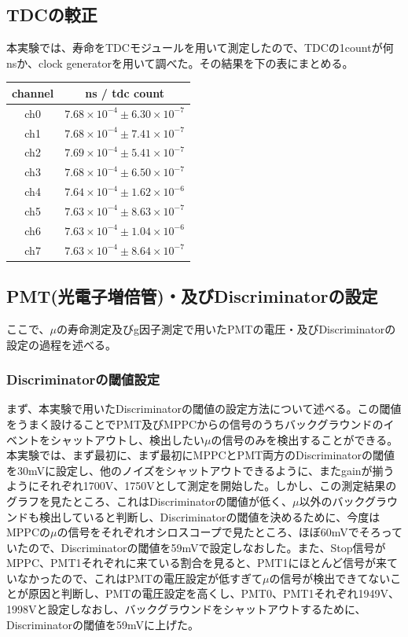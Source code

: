 \subsection{TDCの較正}
本実験では、寿命をTDCモジュールを用いて測定したので、TDCの1countが何nsか、clock generatorを用いて調べた。その結果を下の表にまとめる。
\begin{center}
  \begin{tabular}{c|c}
    channel & ns / tdc count \\ \hline
    ch0 & $7.68\times 10^{-4}\pm 6.30\times 10^{-7}$ \\
    ch1 & $7.68\times 10^{-4}\pm 7.41\times 10^{-7}$ \\
    ch2 & $7.69\times 10^{-4}\pm 5.41\times 10^{-7}$ \\
    ch3 & $7.68\times 10^{-4}\pm 6.50\times 10^{-7}$ \\
    ch4 & $7.64\times 10^{-4}\pm 1.62\times 10^{-6}$ \\
    ch5 & $7.63\times 10^{-4}\pm 8.63\times 10^{-7}$ \\
    ch6 & $7.63\times 10^{-4}\pm 1.04\times 10^{-6}$ \\
    ch7 & $7.63\times 10^{-4}\pm 8.64\times 10^{-7}$ \\
  \end{tabular}
\end{center}
\subsection{PMT(光電子増倍管)・及びDiscriminatorの設定}
ここで、$\mu$の寿命測定及びg因子測定で用いたPMTの電圧・及びDiscriminatorの設定の過程を述べる。
\subsubsection{Discriminatorの閾値設定}
まず、本実験で用いたDiscriminatorの閾値の設定方法について述べる。この閾値をうまく設けることでPMT及びMPPCからの信号のうちバックグラウンドのイベントをシャットアウトし、検出したい$\mu$の信号のみを検出することができる。
本実験では、まず最初に、まず最初にMPPCとPMT両方のDiscriminatorの閾値を30mVに設定し、他のノイズをシャットアウトできるように、またgainが揃うようにそれぞれ1700V、1750Vとして測定を開始した。しかし、この測定結果のグラフを見たところ、これはDiscriminatorの閾値が低く、$\mu$以外のバックグラウンドも検出していると判断し、Discriminatorの閾値を決めるために、今度はMPPCの$\mu$の信号をそれぞれオシロスコープで見たところ、ほぼ60mVでそろっていたので、Discriminatorの閾値を59mVで設定しなおした。また、Stop信号がMPPC、PMT1それぞれに来ている割合を見ると、PMT1にほとんど信号が来ていなかったので、これはPMTの電圧設定が低すぎて$\mu$の信号が検出できてないことが原因と判断し、PMTの電圧設定を高くし、PMT0、PMT1それぞれ1949V、1998Vと設定しなおし、バックグラウンドをシャットアウトするために、Discriminatorの閾値を59mVに上げた。
